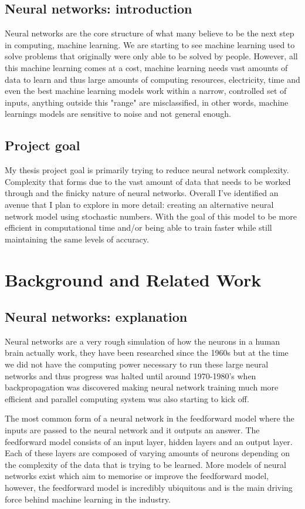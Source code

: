 \documentclass[a4paper,oneside,phd,etd]{BYUPhys}
\begin{document}
\section{Neural networks: introduction}
Neural networks are the core structure of what many believe to be the next step in computing, machine learning. We are starting to see machine learning used to solve problems that originally were only able to be solved by people. However, all this machine learning comes at a cost, machine learning needs vast amounts of data to learn and thus large amounts of computing resources, electricity, time and even the best machine learning models work within a narrow, controlled set of inputs, anything outside this "range" are misclassified, in other words, machine learnings models are sensitive to noise and not general enough.

\section{Project goal}
My thesis project goal is primarily trying to reduce neural network complexity. Complexity that forms due to the vast amount of data that needs to be worked through and the finicky nature of neural networks. Overall I've identified an avenue that I plan to explore in more detail: creating an alternative neural network model using stochastic numbers. With the goal of this model to be more efficient in computational time and/or being able to train faster while still maintaining the same levels of accuracy.

\chapter{Background and Related Work}
\label{chap:LitReview}

\section{Neural networks: explanation}
Neural networks are a very rough simulation of how the neurons in a human brain actually work\cite{neural-network-intro}, they have been researched since the 1960s\cite{neural-network-history} but at the time we did not have the computing power necessary to run these large neural networks and thus progress was halted until around 1970-1980's when backpropagation was discovered making neural network training much more efficient and parallel computing system was also starting to kick off.

The most common form of a neural network in the feedforward model where the inputs are passed to the neural network and it outputs an answer. The feedforward model consists of an input layer, hidden layers and an output layer. Each of these layers are composed of varying amounts of neurons depending on the complexity of the data that is trying to be learned. More models of neural networks exist which aim to memorise or improve the feedforward model, however, the feedforward model is incredibly ubiquitous and is the main driving force behind machine learning in the industry. 
\end{document}
